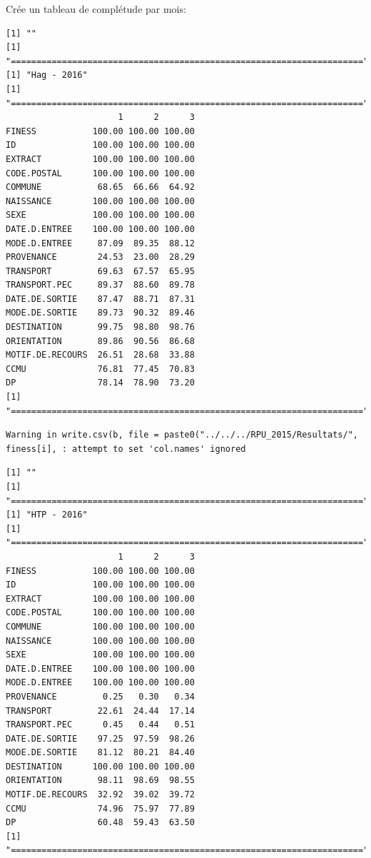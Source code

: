 \documentclass[]{article}
\begin{document}
Crée un tableau de complétude par mois:

\begin{verbatim}
[1] ""
[1] "====================================================================="
[1] "Hag - 2016"
[1] "====================================================================="
                      1      2      3
FINESS           100.00 100.00 100.00
ID               100.00 100.00 100.00
EXTRACT          100.00 100.00 100.00
CODE.POSTAL      100.00 100.00 100.00
COMMUNE           68.65  66.66  64.92
NAISSANCE        100.00 100.00 100.00
SEXE             100.00 100.00 100.00
DATE.D.ENTREE    100.00 100.00 100.00
MODE.D.ENTREE     87.09  89.35  88.12
PROVENANCE        24.53  23.00  28.29
TRANSPORT         69.63  67.57  65.95
TRANSPORT.PEC     89.37  88.60  89.78
DATE.DE.SORTIE    87.47  88.71  87.31
MODE.DE.SORTIE    89.73  90.32  89.46
DESTINATION       99.75  98.80  98.76
ORIENTATION       89.86  90.56  86.68
MOTIF.DE.RECOURS  26.51  28.68  33.88
CCMU              76.81  77.45  70.83
DP                78.14  78.90  73.20
[1] "====================================================================="
\end{verbatim}

\begin{verbatim}
Warning in write.csv(b, file = paste0("../../../RPU_2015/Resultats/",
finess[i], : attempt to set 'col.names' ignored
\end{verbatim}

\begin{verbatim}
[1] ""
[1] "====================================================================="
[1] "HTP - 2016"
[1] "====================================================================="
                      1      2      3
FINESS           100.00 100.00 100.00
ID               100.00 100.00 100.00
EXTRACT          100.00 100.00 100.00
CODE.POSTAL      100.00 100.00 100.00
COMMUNE          100.00 100.00 100.00
NAISSANCE        100.00 100.00 100.00
SEXE             100.00 100.00 100.00
DATE.D.ENTREE    100.00 100.00 100.00
MODE.D.ENTREE    100.00 100.00 100.00
PROVENANCE         0.25   0.30   0.34
TRANSPORT         22.61  24.44  17.14
TRANSPORT.PEC      0.45   0.44   0.51
DATE.DE.SORTIE    97.25  97.59  98.26
MODE.DE.SORTIE    81.12  80.21  84.40
DESTINATION      100.00 100.00 100.00
ORIENTATION       98.11  98.69  98.55
MOTIF.DE.RECOURS  32.92  39.02  39.72
CCMU              74.96  75.97  77.89
DP                60.48  59.43  63.50
[1] "====================================================================="
\end{verbatim}
\end{document}
